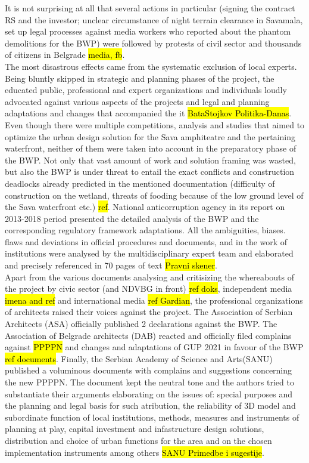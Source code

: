 \documentclass[11pt]{report}
\begin{document}
It is not surprising at all that several actions in particular (signing the contract RS and the investor; unclear circumstance of night terrain clearance in Savamala, set up legal processes against media workers who reported about the phantom demolitions for the BWP) were followed by protests of civil sector and thousands of citizens in Belgrade \hl{media, fb}.
\\
The most disastrous effects came from the systematic exclusion of local experts.
Being bluntly skipped in strategic and planning phases of the project, the educated public, professional and expert organizations and individuals loudly advocated against various aspects of the projects and legal and planning adaptations and changes that accompanied the it 
\hl{BataStojkov Politika-Danas}.
Even though there were multiple competitions, analysis and studies that aimed to optimize the urban design solution for the Sava amphiteatre and the pertaining waterfront, neither of them were taken into account in the preparatory phase of the BWP. %
Not only that vast amount of work and solution framing was wasted, but also the BWP is under threat to entail the exact conflicts and construction deadlocks already predicted in the mentioned documentation (difficulty of construction on the wetland, threats of fooding because of the low ground level of the Sava waterfront etc.) \hl{ref}.
National anticorruption agency in its report on 2013-2018 period presented the detailed analysis of the BWP and the corresponding regulatory framework adaptations. All the ambiguities, biases. flaws and deviations in official procedures and documents, and in the work of institutions were analysed by the multidisciplinary expert team and elaborated and precisely referenced in 70 pages of text \hl{Pravni skener}.
\\
Apart from the various documents analysing and critisizing the whereabouts of the project by civic sector (and NDVBG in front) \hl{ref doks}, independent media \hl{imena and ref} and international media \hl{ref Gardian}, the professional organizations of architects raised their voices against the project.
The Association of Serbian Architects (ASA) officially published 2 declarations against the BWP. 
The Association of Belgrade architects (DAB) reacted and officially filed complains against \hl{PPPPN} and changes and adaptations of GUP 2021 in favour of the BWP \hl{ref documents}.
Finally, the Serbian Academy of Science and Arts(SANU) published a voluminous documents with complains and suggestions concerning the new PPPPN. The document kept the neutral tone and the authors tried to substantiate their arguments elaborating on the issues of: special purposes and the planning and legal basis for such atribution, the reliability of 3D model and subordinate function of local institutions, methods, measures and instruments of planning at play, capital investment and infastructure design solutions, distribution and choice of urban functions for the area and on the chosen implementation instruments among others \hl{SANU Primedbe i sugestije}. 
\end{document}
